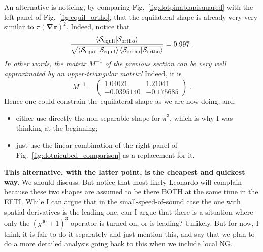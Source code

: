 \documentclass[aps,prd,amsmath,floats,floatfix,superscriptaddress,nofootinbib%
]{revtex4}%
\renewcommand\({\left(}
\renewcommand\){\right)}
\renewcommand\[{\left[}
\renewcommand\]{\right]}
\renewcommand{\vec}{\bm}
\begin{document}
An alternative is noticing, by comparing Fig.~\ref{fig:dotpinablapisquared} with the left panel of Fig.~\ref{fig:equil_ortho}, that the equilateral shape is already very very similar to $\dot{\pi}(\vec{\nabla}\pi)^2$. Indeed, notice that 
\begin{equation}
\frac{\braket{{\cal S}_{\rm equil}|{\cal S}_{\rm ortho}}}{\sqrt{\braket{{\cal S}_{\rm equil}|{\cal S}_{\rm equil}}\braket{{\cal S}_{\rm ortho}|{\cal S}_{\rm ortho}}}} = 0.997\,\,. 
\end{equation} 
\emph{In other words, the matrix $M^{-1}$ of the previous section can be very well approximated by an upper-triangular matrix!} Indeed, it is 
\begin{equation}
M^{-1} = \begin{pmatrix}
1.04021 & 1.21041 \\
-0.0395140 & -0.175685
\end{pmatrix}
\,\,. 
\end{equation}
Hence one could constrain the equilateral shape as we are now doing, and:
\begin{itemize}[leftmargin=*]
\item either use directly the non-separable shape for ${\dot\pi}^3$, which is why I was thinking at the beginning; 
\item just use the linear combination of the right panel of Fig.~\ref{fig:dotpicubed_comparison} as a replacement for it. 
\end{itemize}
\textbf{This alternative, with the latter point, is the cheapest and quickest way.} We should discuss. But notice that most likely Leonardo will complain because these two shapes are assumed to be there BOTH at the same time in the EFTI. While I can argue that in the small-speed-of-sound case the one with spatial derivatives is the leading one, can I argue that there is a situation where only the $(g^{00}+1)^3$ operator is turned on, or is leading? Unlikely. But for now, I think it is fair to do it separately and just mention this, and say that we plan to do a more detailed analysis going back to this when we include local NG. 
\end{document}
